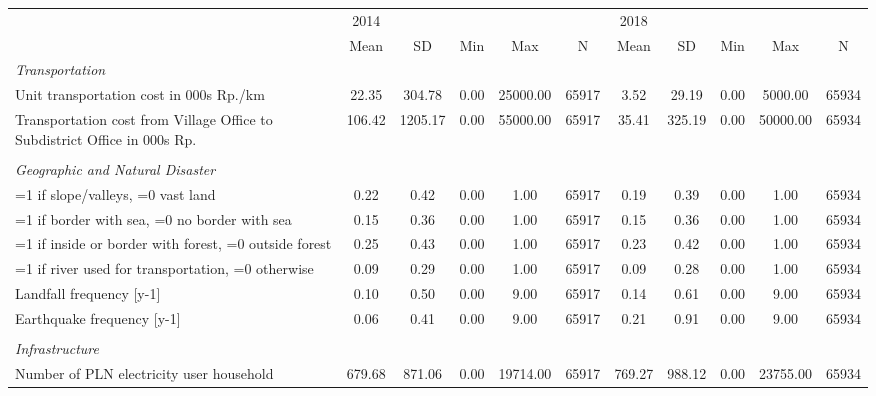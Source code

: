 \begin{tabular}{l*{2}{ccccc}}
\toprule
                &     2014&         &         &         &         &     2018&         &         &         &         \\
                &     Mean&       SD&      Min&      Max&        N&     Mean&       SD&      Min&      Max&        N\\
\midrule
\emph{Transportation}&         &         &         &         &         &         &         &         &         &         \\
Unit transportation cost in 000s Rp./km&    22.35&   304.78&     0.00& 25000.00&    65917&     3.52&    29.19&     0.00&  5000.00&    65934\\
Transportation cost from Village Office to Subdistrict Office in 000s Rp.&   106.42&  1205.17&     0.00& 55000.00&    65917&    35.41&   325.19&     0.00& 50000.00&    65934\\
\vspace{0.1em} \\ \emph{Geographic and Natural Disaster}&         &         &         &         &         &         &         &         &         &         \\
=1 if slope/valleys, =0 vast land&     0.22&     0.42&     0.00&     1.00&    65917&     0.19&     0.39&     0.00&     1.00&    65934\\
=1 if border with sea, =0 no border with sea&     0.15&     0.36&     0.00&     1.00&    65917&     0.15&     0.36&     0.00&     1.00&    65934\\
=1 if inside or border with forest, =0 outside forest&     0.25&     0.43&     0.00&     1.00&    65917&     0.23&     0.42&     0.00&     1.00&    65934\\
=1 if river used for transportation, =0 otherwise&     0.09&     0.29&     0.00&     1.00&    65917&     0.09&     0.28&     0.00&     1.00&    65934\\
Landfall frequency [y-1]&     0.10&     0.50&     0.00&     9.00&    65917&     0.14&     0.61&     0.00&     9.00&    65934\\
Earthquake frequency [y-1]&     0.06&     0.41&     0.00&     9.00&    65917&     0.21&     0.91&     0.00&     9.00&    65934\\
\vspace{0.1em} \\ \emph{Infrastructure}&         &         &         &         &         &         &         &         &         &         \\
Number of PLN electricity user household&   679.68&   871.06&     0.00& 19714.00&    65917&   769.27&   988.12&     0.00& 23755.00&    65934\\

\end{tabular}
